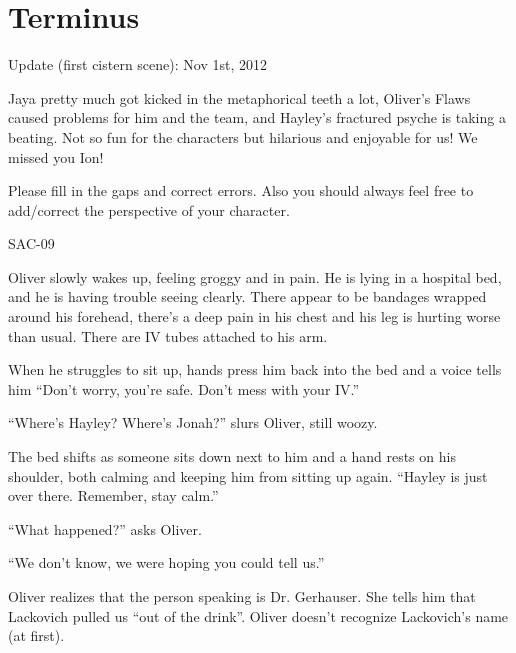 \setcounter{chapter}{ 7 }
\chapter{\textbf{Terminus} }




Update (first cistern scene): Nov 1st, 2012



Jaya pretty much got kicked in the metaphorical teeth a lot, Oliver's Flaws caused problems for him and the team, and Hayley's fractured psyche is taking a beating.  Not so fun for the characters but hilarious and enjoyable for us!  We missed you Ion!



Please fill in the gaps and correct errors.  Also you should always feel free to add/correct the perspective of your character.



\noindent\hrulefill





 {\LARGE SAC-09 } 



Oliver slowly wakes up, feeling groggy and in pain.  He is lying in a hospital bed, and he is having trouble seeing clearly.  There appear to be bandages wrapped around his forehead, there's a deep pain in his chest and his leg is hurting worse than usual.  There are IV tubes attached to his arm.



When he struggles to sit up, hands press him back into the bed and a voice tells him ``Don't worry, you're safe.  Don't mess with your IV.''

``Where's Hayley?  Where's Jonah?'' slurs Oliver, still woozy.

The bed shifts as someone sits down next to him and a hand rests on his shoulder, both calming and keeping him from sitting up again.  ``Hayley is just over there.  Remember, stay calm.''

``What happened?'' asks Oliver.

``We don't know, we were hoping you could tell us.''



Oliver realizes that the person speaking is Dr. Gerhauser.  She tells him that Lackovich pulled us ``out of the drink''.  Oliver doesn't recognize Lackovich's name (at first).



